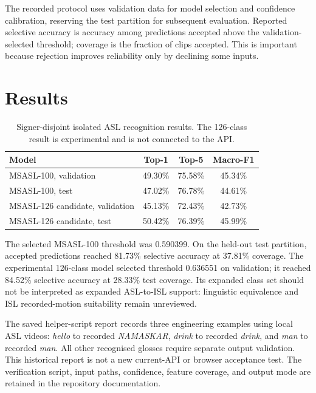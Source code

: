 \documentclass[journal,twocolumn]{IEEEtran}
\begin{document}
The recorded protocol uses validation data for model selection and confidence
calibration, reserving the test partition for subsequent evaluation.
Reported selective accuracy is accuracy among predictions accepted above the
validation-selected threshold; coverage is the fraction of clips accepted. This
is important because rejection improves reliability only by declining some
inputs.

\section{Results}
\begin{table}[t]
\caption{Signer-disjoint isolated ASL recognition results. The 126-class result
is experimental and is not connected to the API.}
\label{tab:recognition}
\centering
\begin{tabular}{lccc}
\toprule
Model & Top-1 & Top-5 & Macro-F1 \\
\midrule
MSASL-100, validation & 49.30\% & 75.58\% & 45.34\% \\
MSASL-100, test & 47.02\% & 76.78\% & 44.61\% \\
MSASL-126 candidate, validation & 45.13\% & 72.43\% & 42.73\% \\
MSASL-126 candidate, test & 50.42\% & 76.39\% & 45.99\% \\
\bottomrule
\end{tabular}
\end{table}

The selected MSASL-100 threshold was 0.590399. On the held-out test partition,
accepted predictions reached 81.73\% selective accuracy at 37.81\% coverage.
The experimental 126-class model selected threshold 0.636551 on validation; it
reached 84.52\% selective accuracy at 28.33\% test coverage. Its expanded class
set should not be interpreted as expanded ASL-to-ISL support: linguistic
equivalence and ISL recorded-motion suitability remain unreviewed.

The saved helper-script report records three engineering examples using local ASL
videos: \textit{hello} to recorded \textit{NAMASKAR}, \textit{drink} to recorded
\textit{drink}, and \textit{man} to recorded \textit{man}. All other recognised
glosses require separate output validation. This historical report is not a new
current-API or browser acceptance test. The verification script, input paths, confidence, feature coverage,
and output mode are retained in the repository documentation.
\end{document}
